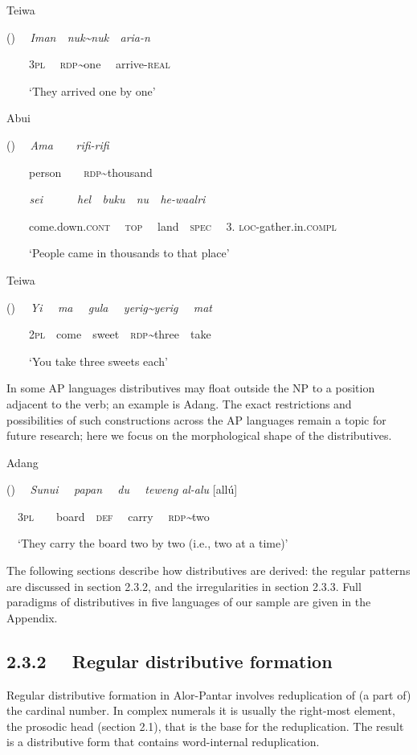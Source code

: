 Teiwa

\label{bkm:Ref342655549}() \ \ \textit{Iman\ \ nuk}\textit{\~{}}\textit{nuk\ \ aria-n}

\textsc{\ \ \ \ }\textsc{3pl} \ \ \textsc{rdp}\textit{\~{}}one \ \ arrive-\textsc{real}

\ \ \ \ {\textquoteleft}They arrived one by one{\textquoteright} 

Abui

\label{bkm:Ref342738939}()  \ \ \textit{Ama\ \ \ \ rifi-rifi\ \ \ \ }

\ \ \ \ person\ \ \ \ \textsc{rdp\~{}}thousand\ \ 

\textit{\ \ \ \ sei\ \ \ \   \ \ hel\ \ buku\ \ nu\ \ he-waalri}

\ \ \ \ come.down.\textsc{cont}  \ \ \textsc{top \ \ }land\ \ \textsc{spec} \ \ 3.\textsc{ loc-}gather.in.\textsc{compl} 

\ \ \ \ {\textquoteleft}People came in thousands to that place{\textquoteright} 

Teiwa

\label{bkm:Ref342655553}() \textit{\ \ Yi \ \ ma \ \ gula \ \ yerig\~{}yerig \ \ mat}

\ \ \ \ 2\textsc{pl\ \ }come\ \ sweet\ \ \textsc{rdp}\textit{\~{}}three\ \ take

\ \ \ \ {\textquoteleft}You take three sweets each{\textquoteright}

In some AP languages distributives may float outside the NP to a position adjacent to the verb; an example is Adang. The exact restrictions and possibilities of such constructions across the AP languages remain a topic for future research; here we focus on the morphological shape of the distributives.

Adang 

()  \ \ \textit{Sunui{\textltailn} \ \ papan \ \ du \ \ teweng }\textit{al-alu} [all\'u]

\ \ 3\textsc{pl\ \ }\ \ board\ \ \textsc{def} \ \ carry \ \ \textsc{rdp}\textit{\~{}}two

\ \ {\textquoteleft}They carry the board two by two (i.e., two at a time){\textquoteright}

The following sections describe how distributives are derived: the regular patterns are discussed in section 2.3.2, and the irregularities in section 2.3.3.  Full paradigms of distributives in five languages of our sample are given in the Appendix.

\subsection[2.3.2 \ \ Regular distributive formation ]{\textmd{2.3.2 \ \ Regular distributive formation}\textmd{ }}
\hypertarget{RefHeading105240871885726}{}Regular distributive formation in Alor-Pantar involves reduplication of (a part of) the cardinal number. In complex numerals it is usually the right-most element, the prosodic head (section 2.1), that is the base for the reduplication. The result is a distributive form that contains word-internal reduplication. 


